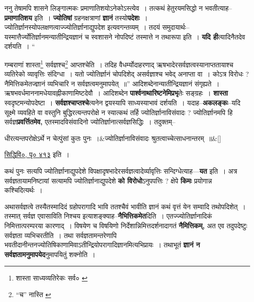 \documentclass[article,12pt,a4paper]{memoir}
\begin{document}
	  \pstart ननु तेषामपि शासने लिङ्गात्मकः प्रमाणातिशयोऽनेकोऽस्त्येव । तत्कथं हेतुरयमसिद्धो न भवतीत्याह--\textbf{प्रमाणातिशय} इति । \textbf{ज्योतिषां} ग्रहनक्षत्राणां \textbf{ज्ञानं} तस्यो\textbf{पदेशः} । ज्योतिर्ज्ञानस्योपलक्षणत्वाज्ज्योतिर्ज्ञानाद्युपदेश इत्यवगन्तव्यम् । तदयं समुदायार्थः--यस्मात्तैर्ज्योतिर्ज्ञानमन्यातीन्द्रियज्ञानं च स्वशासने नोपदिष्टं तस्मात्ते न तथारूपा इति । \textbf{यदि ही}त्यादिनैतदेव दर्शयति ।  \leavevmode{} “
	  
	गम्बराणां शास्ता\footnote{शास्ता साध्यव्यतिरेकः सर्व० \cite{dp-msC}} सर्वज्ञश्च\footnote{“च” नास्ति \cite{dp-msA} \cite{dp-msB} \cite{dp-edP} \cite{dp-edH} \cite{dp-edE} \cite{dp-edN}} आप्तश्चेति । तदिह वैधर्म्योदाहरणाद् ऋषभादेरसर्वज्ञत्वस्यानाप्ततायाश्च व्यतिरेको व्यावृत्तिः संदिग्धा । यतो ज्योतिर्ज्ञानं चोपदिशेद् असर्वज्ञाश्च भवेद् अनाप्ता वा । कोऽत्र विरोधः ? नैमित्तिकमेतज्ज्ञानं व्यभिचारि न सर्वज्ञत्वमनुमापयेत् ॥” आदिशब्देनान्यातीन्द्रियज्ञानं संगृह्यते । ऋषभवर्धमाननामधेयावह्नीकाणामिष्टदेवौ । आदिशब्देन \textbf{पार्श्वनाथारिष्टनेमिप्रभृ}तेः सङ्ग्रहः । \textbf{शास्ता} स्वदृष्टमन्योपदेष्टा । \textbf{सर्वज्ञश्चाप्तश्चे}त्यनेन द्वयस्यापि साध्यस्याभावं दर्शयति । यदाह--\textbf{अकलङ्कः}--यदि सूक्ष्मे व्यवहिते वा वस्तुनि बुद्धिरत्यन्तपरोक्षे न स्यात्कथं तर्हि ज्योतिर्ज्ञानाविसंवादः ? ज्योतिर्ज्ञानमपि हि सर्वज्ञ\textbf{प्रवर्त्तितमेव,} एतस्मादविसंवादिनो ज्योतिर्ज्ञानात्सर्वज्ञसिद्धिः । तदुक्तम्--
	\pend
      
	  \bigskip
	  \begingroup
	
	    
	    \stanza[\smallbreak]
	धीरत्यन्तपरोक्षेऽर्थे न चेत्पुंसां कुतः पुनः ।&ज्योतिर्ज्ञानाविसंवादः श्रुतत्वाच्चेत्साधनान्तरम् ॥\&[\smallbreak]


	\href{http://http://sarit.indology.info/?cref=svi.p413}{सिद्धिवि०, पृ० ४१३} इति ।
	  \endgroup
	

	  \pstart कथं पुनः सत्यपि ज्योतिर्ज्ञानाद्युपदेशे विपक्षादृषभादेरसर्वज्ञत्वादेर्व्यावृत्तिः सन्दिग्धेत्याह—\textbf{यत} इति । अत्र सर्वज्ञतायामनिष्टायां सत्यामपि ज्योतिर्ज्ञानाद्युपदेशे \textbf{को विरोधो}ऽनुपपत्तिः ? क्षेपे \textbf{किमः} प्रयोगान्न कश्चिदित्यर्थः ।
	\pend
      

	  \pstart अथासर्वज्ञत्वे तस्यैतस्मादिदं ग्रहोपरागादि भावि ततश्चैवं भावीति ज्ञानं कथं वृत्तं येन सम्वादि तथोपदिशेत् । तस्मात् सर्वज्ञ एवासाविति निश्चय इत्याशङ्क्याह--\textbf{नैभित्तिकमेत}दिति । एतज्ज्योतिर्ज्ञानादिकं निमित्तात्परम्परया कारणाद् । विषयेण च विषयिणो निर्देशान्निमित्तदर्शनादागतं \textbf{नैमित्तिकम्,} अत एव तदुपदेष्टुः सर्वज्ञता व्यभिचरतीति । तथा सर्वज्ञतामन्तरेणापि भवतीदानीन्तनज्योतिषिकाणामिवाऽतीन्द्रियोपरागादिज्ञानमित्यभिप्रायः । तथाभूतं \textbf{ज्ञानं न सर्वज्ञतामनुमापयेद}नुमापयितुं शक्नोति ।
	\pend
      
\end{document}
